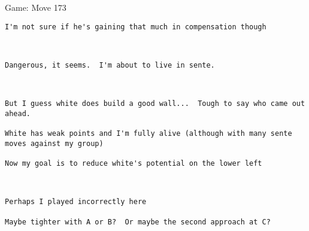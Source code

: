 \documentclass{article}
\begin{document}
\begin{section}{Game: Move 173}
\begin{center}
\begin{lstlisting}
I'm not sure if he's gaining that much in compensation though\end{lstlisting}
\end{center}
\begin{center}
\cleargoban
{}
\showfullgoban
\\\begin{lstlisting}
Dangerous, it seems.  I'm about to live in sente.\end{lstlisting}
\end{center}
\begin{center}
\cleargoban
{}
\showfullgoban
\\\begin{lstlisting}
But I guess white does build a good wall...  Tough to say who came out ahead.

White has weak points and I'm fully alive (although with many sente moves against my group)

Now my goal is to reduce white's potential on the lower left\end{lstlisting}
\end{center}
\begin{center}
\cleargoban
{}
\showfullgoban
\\\begin{lstlisting}
Perhaps I played incorrectly here

Maybe tighter with A or B?  Or maybe the second approach at C?


\end{lstlisting}
\end{center}
\end{section}
\end{document}
